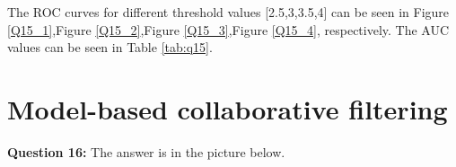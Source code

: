 \documentclass{article}
\begin{document}
\begin{table}[h]
\center
\caption{AUC values of different thresholds}
\label{tab:q15}
\end{table}

The ROC curves for different threshold values [2.5,3,3.5,4] can be seen in Figure \ref{Q15_1},Figure \ref{Q15_2},Figure \ref{Q15_3},Figure \ref{Q15_4}, respectively. The AUC values can be seen in Table \ref{tab:q15}.
\newline

\section{Model-based collaborative filtering}

\bigbreak \textbf{Question 16:}
The answer is in the picture below.

\begin{figure}
\end{figure}
\end{document}
